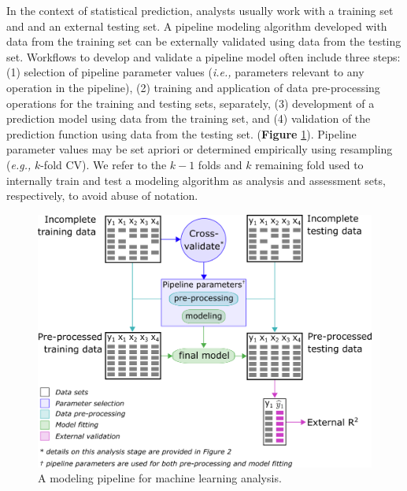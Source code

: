 \documentclass[AMA,STIX1COL,doublespace]{WileyNJD-v2}
\begin{document}
In the context of statistical prediction, analysts usually work with a
training set and and an external testing set. A pipeline modeling
algorithm developed with data from the training set can be externally
validated using data from the testing set. Workflows to develop and
validate a pipeline model often include three steps: (1) selection of
pipeline parameter values (\textit{i.e., }parameters relevant to any
operation in the pipeline), (2) training and application of data
pre-processing operations for the training and testing sets, separately,
(3) development of a prediction model using data from the training set,
and (4) validation of the prediction function using data from the
testing set. (\textbf{Figure} \ref{fig:workflow_ml}). Pipeline parameter
values may be set apriori or determined empirically using resampling
(\textit{e.g., }\(k\)-fold CV). We refer to the \(k-1\) folds and \(k\)
remaining fold used to internally train and test a modeling algorithm as
analysis and assessment sets, respectively, to avoid abuse of notation.

\begin{figure}
\includegraphics[width=1\linewidth]{figs/workflow_ML} 
\caption{A modeling pipeline for machine learning analysis.}
\label{fig:workflow_ml}
\end{figure}
\end{document}
